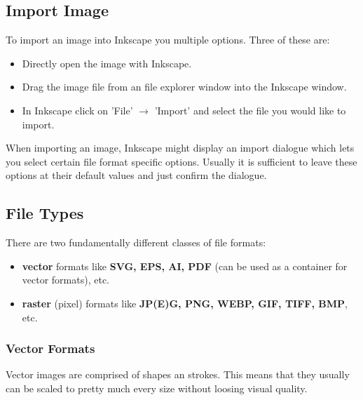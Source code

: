 \documentclass{article}
\begin{document}
        \pagebreak

        \subsection{Import Image}
            
            To import an image into Inkscape you multiple options. Three of these are:

            \begin{itemize}
                \item Directly open the image with Inkscape.
                \item Drag the image file from an file explorer window into the Inkscape window.
                \item In Inkscape click on 'File' $\rightarrow$ 'Import' and select the file you would like to import.
            \end{itemize}

            When importing an image, Inkscape might display an import dialogue which lets you select certain file format specific options.
            Usually it is sufficient to leave these options at their default values and just confirm the dialogue.
        
        \subsection{File Types}

            There are two fundamentally different classes of file formats:
            \begin{itemize}
                \item \textbf{vector} formats like \textbf{SVG, EPS, AI, PDF} (can be used as a container for vector formats), etc. 
                \item \textbf{raster} (pixel) formats like \textbf{JP(E)G, PNG, WEBP, GIF, TIFF, BMP}, etc.
            \end{itemize}     

            \subsubsection{Vector Formats}

                Vector images are comprised of shapes an strokes.
                This means that they usually can be scaled to pretty much every size without loosing visual quality.
                
\end{document}
